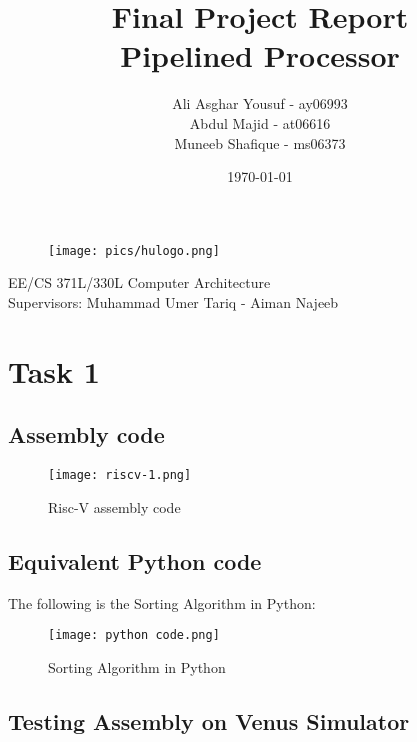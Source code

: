 \documentclass{article}
\title{\huge{\textbf{Final Project Report}}\\
\LARGE{Pipelined Processor}}
\author{Ali Asghar Yousuf - ay06993\\
        Abdul Majid - at06616\\
        Muneeb Shafique - ms06373}
\date{\today}
\begin{document}
\clearpage\maketitle
\thispagestyle{empty}
\begin{center}
    \begin{figure}[h]
        \centering
        \texttt{[image: pics/hulogo.png]}
        \label{fig:logo}
    \end{figure}
    \large{EE/CS 371L/330L Computer Architecture \\
    Supervisors: Muhammad Umer Tariq - Aiman Najeeb}
\end{center}
\newpage
\setcounter{page}{1}
\tableofcontents


\newpage
{} %

\section{Task 1}
\subsection{Assembly code}
\begin{center}
    \begin{figure}[!htb]
        \centering
        \texttt{[image: riscv-1.png]}
        \caption{Risc-V assembly code}
        \label{fig: User flow Diagram}
    \end{figure}
\end{center}



\subsection{Equivalent Python code}
The following is the Sorting Algorithm in Python:
\begin{center}
    \begin{figure}[!htb]
        \centering
        \texttt{[image: python code.png]}
        \caption{Sorting Algorithm in Python}
        \label{Sorting Algorithm in Python}
    \end{figure}
\end{center}

\subsection{Testing Assembly on Venus Simulator}
\end{document}
